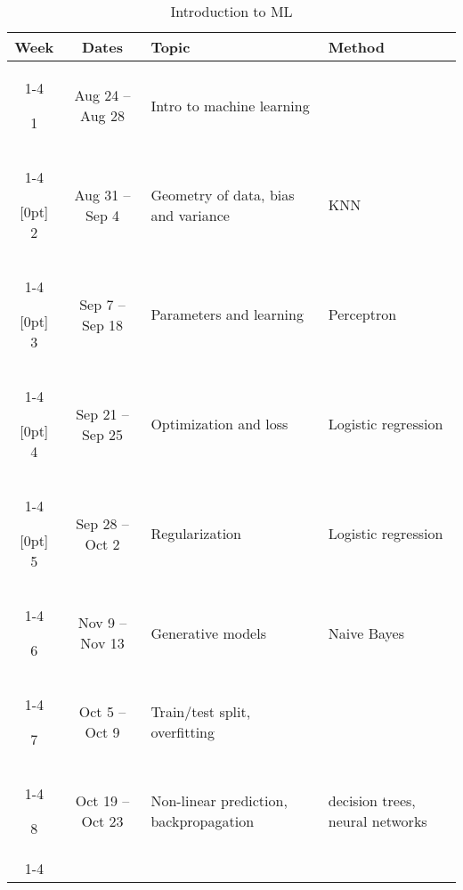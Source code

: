 \documentclass[10pt]{memoir}
\begin{document}
\begin{table}[htb!]
\centering
\begin{tabular}{ccll}
     \textbf{Week} & \textbf{Dates} & \textbf{Topic} & \textbf{Method}   \\
    \cmidrule[.1em](lr){1-4}
    
     1 & Aug 24 -- Aug 28 & Intro to machine learning &  \\
    \cmidrule[.1em](lr){1-4} 
 
     \multirow{1}{*}[0pt]{\textit{}} 
         2 & Aug 31 -- Sep 4 & Geometry of data, bias and variance & KNN  \\ 
        \cmidrule[.1em](lr){1-4}
        
    \multirow{1}{*}[0pt]{\textit{}} 
         3 & Sep 7 -- Sep 18 & Parameters and learning & Perceptron   \\ \cmidrule[.1em](lr){1-4}

    \multirow{1}{*}[0pt]{} 
         4 & Sep 21 -- Sep 25 & Optimization and loss & Logistic regression \\   \cmidrule[.1em](lr){1-4}    

   \multirow{1}{*}[0pt]{} %
         5 & Sep 28 -- Oct 2 &  Regularization & Logistic regression  \\ \cmidrule[.1em](lr){1-4}             

     6 & Nov 9 -- Nov 13 & Generative models & Naive Bayes \\
    \cmidrule[.1em](lr){1-4} 

    7 & Oct 5 -- Oct 9 &  Train/test split, overfitting  &   \\
    \cmidrule[.1em](lr){1-4}

   8  &  Oct 19 -- Oct 23 & Non-linear prediction, backpropagation  & decision trees, neural networks \\
    \cmidrule[.1em](lr){1-4}

\end{tabular}\\
\caption{Introduction to ML}
\end{table}
\end{document}
